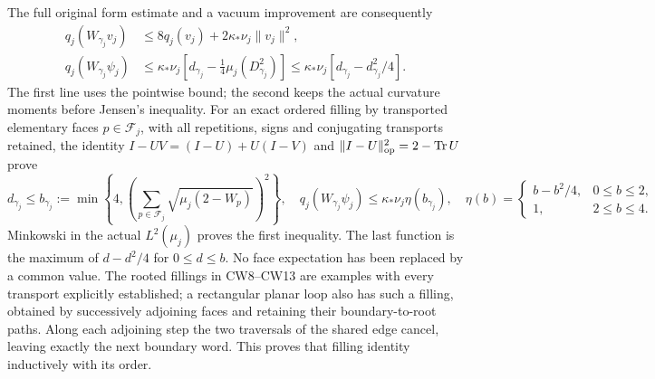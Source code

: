 \documentclass[11pt]{article}
\begin{document}
The full original form estimate and a vacuum improvement are consequently
\[
\begin{aligned}
 q_j(W_{\gamma_j}v_j)&\le8q_j(v_j)+2\kappa_*\nu_j\|v_j\|^2,\\
 q_j(W_{\gamma_j}\psi_j)&\le\kappa_*\nu_j
       \left[d_{\gamma_j}-\tfrac14\mu_j(D_{\gamma_j}^2)\right]
 \le\kappa_*\nu_j\left[d_{\gamma_j}-d_{\gamma_j}^2/4\right].
\end{aligned}\tag{ASL41}
\]
The first line uses the pointwise bound; the second keeps the actual curvature moments before Jensen's inequality. For an exact ordered filling by transported elementary faces \(p\in\mathcal F_j\), with all repetitions, signs and conjugating transports retained, the identity \(I-UV=(I-U)+U(I-V)\) and \(\|I-U\|_{\rm op}^2=2-\operatorname{Tr}U\) prove
\[
 d_{\gamma_j}\le b_{\gamma_j}:=
 \min\left\{4,\left(\sum_{p\in\mathcal F_j}\sqrt{\mu_j(2-W_p)}\right)^2\right\},
 \quad
 q_j(W_{\gamma_j}\psi_j)\le\kappa_*\nu_j\eta(b_{\gamma_j}),
 \quad
 \eta(b)=\begin{cases}b-b^2/4,&0\le b\le2,\\1,&2\le b\le4.\end{cases}
 \tag{ASL42}
\]
Minkowski in the actual \(L^2(\mu_j)\) proves the first inequality. The last function is the maximum of \(d-d^2/4\) for \(0\le d\le b\). No face expectation has been replaced by a common value. The rooted fillings in CW8–CW13 are examples with every transport explicitly established; a rectangular planar loop also has such a filling, obtained by successively adjoining faces and retaining their boundary-to-root paths. Along each adjoining step the two traversals of the shared edge cancel, leaving exactly the next boundary word. This proves that filling identity inductively with its order.
\end{document}
